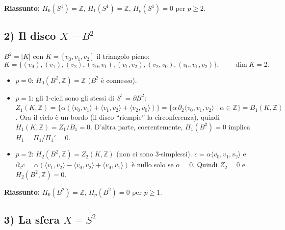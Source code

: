 \textbf{Riassunto:} $H_0(S^1) = \mathbb{Z}$, $H_1(S^1) = \mathbb{Z}$, $H_p(S^1) = 0$ per $p \geqslant 2$.

\subsection{2) Il disco $X = B^2$}

$B^2 = |K|$ con $K = [v_0, v_1, v_2]$ il triangolo pieno:
\[
K = \{ (v_0), (v_1), (v_2), (v_0, v_1), (v_1, v_2), (v_2, v_0), (v_0, v_1, v_2) \}, \qquad \dim K = 2 .
\]
\begin{itemize}
    \item $p = 0$: $H_0(B^2, \mathbb{Z}) = \mathbb{Z}$ ($B^2$ \`e connesso).
    \item $p = 1$: gli $1$-cicli sono gli stessi di $S^1 = \partial B^2$: $Z_1(K, \mathbb{Z}) = \{ \alpha ( \langle v_0, v_1 \rangle + \langle v_1, v_2 \rangle + \langle v_2, v_0 \rangle ) \} = \{ \alpha\, \partial_2 \langle v_0, v_1, v_2 \rangle \mid \alpha \in \mathbb{Z} \} = B_1(K, \mathbb{Z})$. Ora il ciclo \`e un bordo (il disco ``riempie'' la circonferenza), quindi $H_1(K, \mathbb{Z}) = Z_1/B_1 = 0$. D'altra parte, coerentemente, $\Pi_1(B^2) = 0$ implica $H_1 = \Pi_1/\Pi_1' = 0$.
    \item $p = 2$: $H_2(B^2, \mathbb{Z}) = Z_2(K, \mathbb{Z})$ (non ci sono $3$-simplessi). $c = \alpha \langle v_0, v_1, v_2 \rangle$ e $\partial_2 c = \alpha( \langle v_1, v_2 \rangle - \langle v_0, v_2 \rangle + \langle v_0, v_1 \rangle )$ \`e nullo solo se $\alpha = 0$. Quindi $Z_2 = 0$ e $H_2(B^2, \mathbb{Z}) = 0$.
\end{itemize}
\textbf{Riassunto:} $H_0(B^2) = \mathbb{Z}$, $H_p(B^2) = 0$ per $p \geqslant 1$.

\subsection{3) La sfera $X = S^2$}

